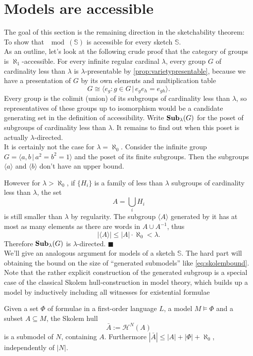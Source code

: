 \section{Models are accessible}
\label{sec:sketchesaccessible}

The goal of this section is the remaining direction in the sketchability theorem: To show that $\mod(\mathbb S)$ is accessible for every sketch $\mathbb S$. \\

As an outline, let's look at the following crude proof that the category of groups is $\aleph_1$-accessible. For every infinite regular cardinal $\lambda$, every group $G$ of cardinality less than $\lambda$ is $\lambda$-presentable by \ref{prop:varietypresentable}, because we have a presentation of $G$ by its own elements and multiplication table
\[ G \cong \langle e_g : g \in G \,|\, e_g e_h = e_{gh} \rangle. \]
Every group is the colimit (union) of its subgroups of cardinality less than $\lambda$, so representatives of these groups up to isomorphism would be a candidate generating set in the definition of accessibility. Write $\mathbf{Sub}_\lambda(G)$ for the poset of subgroups of cardinality less than $\lambda$. It remains to find out when this poset is actually $\lambda$-directed. \\

It is certainly not the case for $\lambda=\aleph_0$. Consider the infinite group $G=\langle a, b \,|\, a^2 = b^2 = 1 \rangle$ and the poset of its finite subgroups. Then the subgroups $\langle a \rangle$ and $\langle b \rangle$ don't have an upper bound.

However for $\lambda > \aleph_0$, if $\{H_i\}$ is a family of less than $\lambda$ subgroups of cardinality less than $\lambda$, the set \[ A = \bigcup_i H_i \]
is still smaller than $\lambda$ by regularity. The subgroup $\langle A \rangle$ generated by it has at most as many elements as there are words in $A \cup A^{-1}$, thus
\begin{equation} |\langle A \rangle| \leq |A|\cdot \aleph_0 < \lambda. \label{eq:skolembound} \end{equation}
Therefore $\mathbf{Sub}_\lambda(G)$ is $\lambda$-directed. $\blacksquare$ \\

We'll give an analogous argument for models of a sketch $\mathbb S$. The hard part will obtaining the bound on the size of ``generated submodels'' like \eqref{eq:skolembound}. Note that the rather explicit construction of the generated subgroup is a special case of the classical Skolem hull-construction in model theory, which builds up a model by inductively including all witnesses for existential formulae 
\begin{Theorem}
Given a set $\Phi$ of formulae in a first-order language $L$, a model $M \models \Phi$ and a subset $A \subseteq M$, the Skolem hull
\[ \bar A := \mathcal H^N(A) \]
is a submodel of $N$, containing $A$. Furthermore $|\bar A| \leq |A| + |\Phi| + \aleph_0$, independently of $|N|$. %
\end{Theorem}

